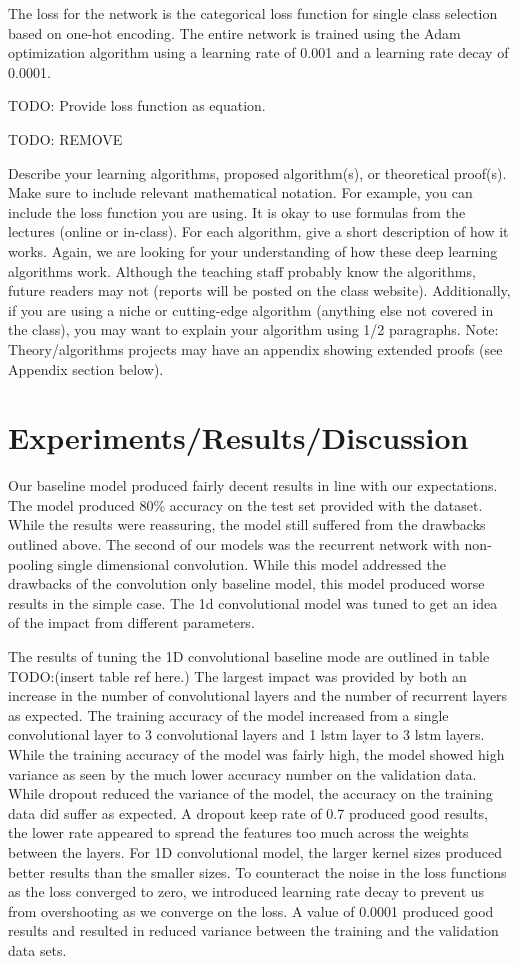 \documentclass{article}
\begin{document}
The loss for the network is the categorical loss function for single
class selection based on one-hot encoding. The entire network is
trained using the Adam optimization algorithm using a learning rate of
0.001 and a learning rate decay of 0.0001.


TODO: Provide loss function as equation.


TODO: REMOVE

Describe your learning algorithms, proposed algorithm(s), or theoretical proof(s). Make
sure to include relevant mathematical notation. For example, you can include the loss function you are using. It is okay to use formulas from the lectures (online or in-class). For each algorithm, give a short description 
of how it works. Again, we are looking for your understanding of how these deep
learning algorithms work. Although the teaching staff probably know the algorithms, future
readers may not (reports will be posted on the class website). Additionally, if you are
using a niche or cutting-edge algorithm (anything else not covered in the class), you may want to explain your algorithm using 1/2
paragraphs. Note: Theory/algorithms projects may have an appendix showing extended
proofs (see Appendix section below).

\section{Experiments/Results/Discussion}
Our baseline model produced fairly decent results in line with our
expectations. The model produced 80\% accuracy on the test set
provided with the dataset. While the results were reassuring, the
model still suffered from the drawbacks outlined above. The second of
our models was the recurrent network with non-pooling single
dimensional convolution. While this model addressed the drawbacks of
the convolution only baseline model, this model produced worse results
in the simple case. The 1d convolutional model was tuned to get an
idea of the impact from different parameters.

The results of tuning the 1D convolutional baseline mode are outlined
in table TODO:(insert table ref here.) The largest impact was provided
by both an increase in the number of convolutional layers and the
number of recurrent layers as expected. The training accuracy of the
model increased from a single convolutional layer to 3 convolutional
layers and 1 lstm layer to 3 lstm layers. While the training accuracy
of the model was fairly high, the model showed high variance as seen
by the much lower accuracy number on the validation data. While
dropout reduced the variance of the model, the accuracy on the
training data did suffer as expected. A dropout keep rate of 0.7
produced good results, the lower rate appeared to spread the features
too much across the weights between the layers. For 1D convolutional
model, the larger kernel sizes produced better results than the
smaller sizes. To counteract the noise in the loss functions as the
loss converged to zero, we introduced learning rate decay to prevent
us from overshooting as we converge on the loss. A value of 0.0001
produced good results and resulted in reduced variance between the
training and the validation data sets.
\end{document}
